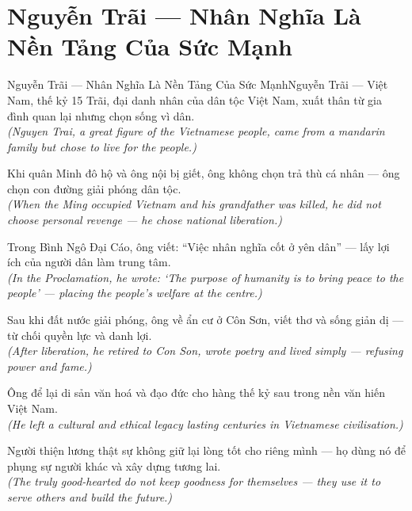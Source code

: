 \section{Nguyễn Trãi --- Nhân Nghĩa Là Nền Tảng Của Sức Mạnh}
\begin{truyen}{Nguyễn Trãi --- Nhân Nghĩa Là Nền Tảng Của Sức Mạnh}{Nguyễn Trãi --- Việt Nam, thế kỷ 15}
 Trãi, đại danh nhân của dân tộc Việt Nam, xuất thân từ gia đình quan lại nhưng chọn sống vì dân.\\[4pt]
\textit{(Nguyen Trai, a great figure of the Vietnamese people, came from a mandarin family but chose to live for the people.)}

Khi quân Minh đô hộ và ông nội bị giết, ông không chọn trả thù cá nhân --- ông chọn con đường giải phóng dân tộc.\\[4pt]
\textit{(When the Ming occupied Vietnam and his grandfather was killed, he did not choose personal revenge --- he chose national liberation.)}

Trong Bình Ngô Đại Cáo, ông viết: ``Việc nhân nghĩa cốt ở yên dân'' --- lấy lợi ích của người dân làm trung tâm.\\[4pt]
\textit{(In the Proclamation, he wrote: `The purpose of humanity is to bring peace to the people' --- placing the people's welfare at the centre.)}

Sau khi đất nước giải phóng, ông về ẩn cư ở Côn Sơn, viết thơ và sống giản dị --- từ chối quyền lực và danh lợi.\\[4pt]
\textit{(After liberation, he retired to Con Son, wrote poetry and lived simply --- refusing power and fame.)}

Ông để lại di sản văn hoá và đạo đức cho hàng thế kỷ sau trong nền văn hiến Việt Nam.\\[4pt]
\textit{(He left a cultural and ethical legacy lasting centuries in Vietnamese civilisation.)}

\end{truyen}
\begin{baihoc}
  Người thiện lương thật sự không giữ lại lòng tốt cho riêng mình --- họ dùng nó để phụng sự người khác và xây dựng tương lai.\\[4pt]
  \textit{(The truly good-hearted do not keep goodness for themselves --- they use it to serve others and build the future.)}
\end{baihoc}

